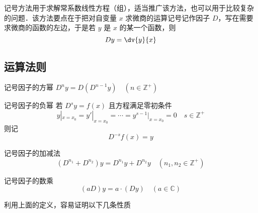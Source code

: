 
\begin{issues}
\issueDraft
\end{issues}

记号方法用于求解常系数线性方程（组），适当推广该方法，也可以用于比较复杂的问题．该方法要点在于把对自变量 $x$ 求微商的运算记号记作因子 $D$，写在需要求微商的函数的左边，于是若 $y$ 是 $x$ 的某一个函数，则
\begin{equation}
Dy=\dv{y}{x}
\end{equation}
\subsection{运算法则}
\begin{definition}{记号因子的方幂}\label{Sign_def1}
$D^ny=D(D^{n-1}y)\quad(n\in\mathbb{Z^{+}})$
\end{definition}
\begin{definition}{记号因子的负幂}
若 $D^sy=f(x)$ 且方程满足零初条件
\begin{equation}
y|_{x=x_0}=y'|_{x=x_0}=\cdots=y^{s-1}|_{x=x_0}=0\quad{s\in\mathbb{Z^{+}}}
\end{equation}
则记
\begin{equation}
D^{-s}f(x)=y
\end{equation}

\end{definition}
\begin{definition}{记号因子的加减法}
\begin{equation}
(D^{n_1}+D^{n_2})y=D^{n_1}y+D^{n_2}y\quad(n_1,n_2\in \mathbb{Z^{+
}})
\end{equation}
\end{definition}
\begin{definition}{记号因子的数乘}
\begin{equation}
(aD)y=a\cdot(Dy)\quad(a\in\mathbb{C})
\end{equation}
\end{definition}
利用上面的定义，容易证明以下几条性质
